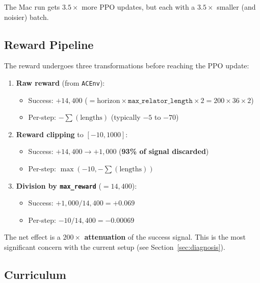 \documentclass[11pt,a4paper]{article}
\begin{document}
The Mac run gets $3.5\times$ more PPO updates, but each with a $3.5\times$
smaller (and noisier) batch.

\subsection{Reward Pipeline}\label{sec:reward}

The reward undergoes three transformations before reaching the PPO update:

\begin{enumerate}[nosep]
  \item \textbf{Raw reward} (from \texttt{ACEnv}):
    \begin{itemize}[nosep]
      \item Success: $+14{,}400$ ($ = \text{horizon} \times \texttt{max\_relator\_length} \times 2 = 200 \times 36 \times 2$)
      \item Per-step: $-\sum(\text{lengths})$ (typically $-5$ to $-70$)
    \end{itemize}

  \item \textbf{Reward clipping} to $[-10, 1000]$:
    \begin{itemize}[nosep]
      \item Success: $+14{,}400 \to +1{,}000$ \quad (\textbf{93\% of signal discarded})
      \item Per-step: $\max(-10, -\sum(\text{lengths}))$
    \end{itemize}

  \item \textbf{Division by \texttt{max\_reward}} ($= 14{,}400$):
    \begin{itemize}[nosep]
      \item Success: $+1{,}000 / 14{,}400 = +0.069$
      \item Per-step: $-10 / 14{,}400 = -0.00069$
    \end{itemize}
\end{enumerate}

\noindent
The net effect is a \textbf{$200\times$ attenuation} of the success signal.
This is the most significant concern with the current setup (see
Section~\ref{sec:diagnosis}).

\subsection{Curriculum}\label{sec:curriculum}
\end{document}
